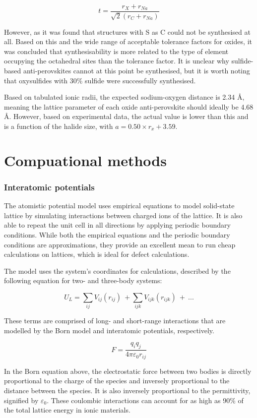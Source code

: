 \documentclass[10pt,a4paper, titlepage]{article}
\begin{document}
$$ t = \frac{r_X + r_{Na}}{\sqrt{2}(r_C + r_{Na})} $$

However, as it was found that structures with S as C could not be synthesised at all. 
Based on this and the wide range of acceptable tolerance factors for oxides, it was concluded that synthesisability is more related to the type of element occupying the octahedral sites than the tolerance factor. 
It is unclear why sulfide-based anti-perovskites cannot at this point be synthesised, but it is worth noting that oxysulfides with 30\% sulfide were successfully synthesised. \cite{RN53} 

Based on tabulated ionic radii, the expected sodium-oxygen distance is 2.34 \AA, meaning the lattice parameter of each oxide anti-perovskite should ideally be 4.68 \AA. 
However, based on experimental data, the actual value is lower than this and is a function of the halide size, with $a = 0.50 \times r_x + 3.59$. \cite{RN53}

\part{Compuational methods}

\section{Interatomic potentials}

The atomistic potential model uses empirical equations to model solid-state lattice by simulating interactions between charged ions of the lattice. 
It is also able to repeat the unit cell in all directions by applying periodic boundary conditions. 
While both the empirical equations and the periodic boundary conditions are approximations, they provide an excellent mean to run cheap calculations on lattices, which is ideal for defect calculations. \cite{RN73} 

The model uses the system’s coordinates for calculations, described by the following equation for two- and three-body systems: 

$$ U_L = \sum_{ij} V_{ij}(r_{ij}) \ + \sum_{ijk} V_{ijk}(r_{ijk}) \ + \: ... $$

These terms are comprised of long- and short-range interactions that are modelled by the Born model and interatomic potentials, respectively. 

$$ F = \frac{q_iq_j}{4\pi\varepsilon_0r_{ij}} $$

In the Born equation above, the electrostatic force between two bodies is directly proportional to the charge of the species and inversely proportional to the distance between the species. 
It is also inversely proportional to the permittivity, signified by $ \varepsilon_0 $. 
These coulombic interactions can account for as high as 90\% of the total lattice energy in ionic materials. \cite{RN74}
\end{document}
